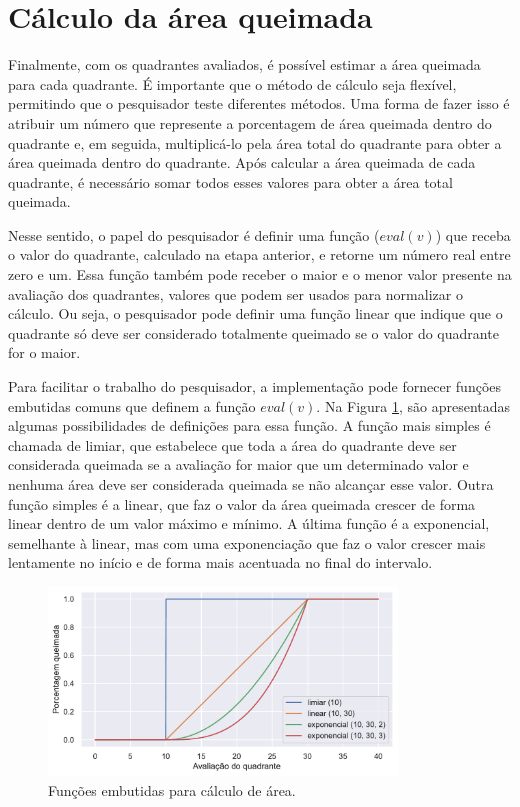 \documentclass[cic,tc]{iiufrgs}
\begin{document}
\section{Cálculo da área queimada}

Finalmente, com os quadrantes avaliados, é possível estimar a área queimada para cada quadrante. É importante que o método de cálculo seja flexível, permitindo que o pesquisador teste diferentes métodos. Uma forma de fazer isso é atribuir um número que represente a porcentagem de área queimada dentro do quadrante e, em seguida, multiplicá-lo pela área total do quadrante para obter a área queimada dentro do quadrante. Após calcular a área queimada de cada quadrante, é necessário somar todos esses valores para obter a área total queimada. \par

Nesse sentido, o papel do pesquisador é definir uma função ($eval(v)$) que receba o valor do quadrante, calculado na etapa anterior, e retorne um número real entre zero e um. Essa função também pode receber o maior e o menor valor presente na avaliação dos quadrantes, valores que podem ser usados para normalizar o cálculo. Ou seja, o pesquisador pode definir uma função linear que indique que o quadrante só deve ser considerado totalmente queimado se o valor do quadrante for o maior.\par

Para facilitar o trabalho do pesquisador, a implementação pode fornecer funções embutidas comuns que definem a função $eval(v)$. Na Figura \ref{fig:eval_func_built_in}, são apresentadas algumas possibilidades de definições para essa função. A função mais simples é chamada de limiar, que estabelece que toda a área do quadrante deve ser considerada queimada se a avaliação for maior que um determinado valor e nenhuma área deve ser considerada queimada se não alcançar esse valor. Outra função simples é a linear, que faz o valor da área queimada crescer de forma linear dentro de um valor máximo e mínimo. A última função é a exponencial, semelhante à linear, mas com uma exponenciação que faz o valor crescer mais lentamente no início e de forma mais acentuada no final do intervalo. \par

\begin{figure}[H]
    \caption{Funções embutidas para cálculo de área.}
    \begin{center}
        \includegraphics[width=25em]{eval_func_built_in}
    \end{center}
    \label{fig:eval_func_built_in}
\end{figure}
\end{document}
